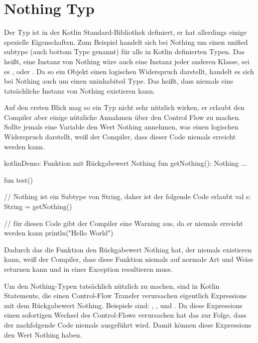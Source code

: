 
\section{Nothing Typ}\label{sec:nothing-type}

\renewcommand{\kapitelautor}{Autor: Marvin Kurka}

Der  Typ ist in der Kotlin Standard-Bibliothek definiert, er hat allerdings einige
spezielle Eigenschaften.
Zum Beispiel handelt sich bei Nothing um einen unified subtype (auch bottom Type genannt) für alle in Kotlin
definierten Typen.
Das heißt, eine Instanz von Nothing wäre auch eine Instanz jeder anderen Klasse, sei es ,
 oder .
Da so ein Objekt einen logischen Widerspruch darstellt, handelt es sich bei Nothing auch um einen uninhabited Type.
Das heißt, dass niemals eine tatsächliche Instanz von Nothing existieren kann.

Auf den ersten Blick mag so ein Typ nicht sehr nützlich wirken, er erlaubt den Compiler aber einige nützliche
Annahmen über den Control Flow zu machen.
Sollte jemals eine Variable den Wert Nothing annehmen, was einen logischen Widerspruch darstellt, weiß der Compiler,
dass dieser Code niemals erreicht werden kann.

\begin{codeBlock}{kotlin}{Demo: Funktion mit Rückgabewert Nothing}
fun getNothing(): Nothing {
    ...
}

fun test() {
    // Nothing ist ein Subtype von String, daher ist der folgende Code erlaubt
    val s: String = getNothing()

    // für diesen Code gibt der Compiler eine Warning aus, da er niemals erreicht werden kann
    println("Hello World")
}
\end{codeBlock}

Dadurch das die Funktion  den Rückgabewert Nothing hat, der niemals existieren kann,
weiß der Compiler, dass diese Funktion niemals auf normale Art und Weise returnen kann und in einer Exception
resultieren muss.

Um den Nothing-Typen tatsächlich nützlich zu machen, sind in Kotlin Statements, die einen Control-Flow Transfer
verursachen eigentlich Expressions mit dem Rückgabewert Nothing.
Beispiele sind: , ,  und .
Da diese Expressions einen sofortigen Wechsel des Control-Flows verursachen hat das zur Folge, dass der nachfolgende
Code niemals ausgeführt wird.
Damit können diese Expressions den Wert Nothing haben.

